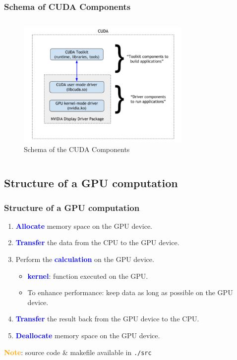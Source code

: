 \begin{frame}
   \frametitle{Schema of CUDA Components}
      \begin{columns}
           \begin{figure}[H]
              \centering
              \includegraphics[width=0.75\textwidth]{./img/CUDAcomponents.png}
		   \caption{\small{Schema of the CUDA Components}}
           \end{figure}
     \end{columns}


\end{frame}	

\subsection{Structure of a GPU computation}
\begin{frame}
   \frametitle{Structure of a GPU computation}
      \begin{enumerate}
	 \item \textbf{\textcolor{blue}{Allocate}} memory space on the GPU device.		      
	 \item \textbf{\textcolor{blue}{Transfer}} the data from the CPU to the GPU device. 
	 \item Perform the \textbf{\textcolor{blue}{calculation}} on the GPU device.
            \begin{itemize} 		 
	       \item \textbf{\textcolor{blue}{kernel}}: function executed on the GPU.
               \item To enhance performance: keep data as long as possible on the GPU device.
	    \end{itemize}
         \item \textbf{\textcolor{blue}{Transfer}} the result back from the GPU device to the CPU.
	 \item \textbf{\textcolor{blue}{Deallocate}} memory space on the GPU device.		 
      \end{enumerate}
      \textbf{\textcolor{orange}{Note}}: source code \& makefile available in \texttt{./src}	
\end{frame}


